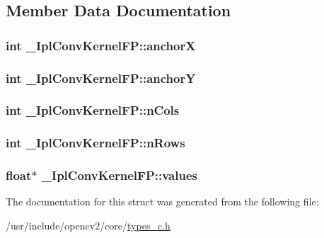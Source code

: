 \subsection{Member Data Documentation}
\hypertarget{struct__IplConvKernelFP_a26d834467c3155173b4fd458bd57d407}{
\subsubsection[{anchor\-X}]{\setlength{\rightskip}{0pt plus 5cm}int \-\_\-\-Ipl\-Conv\-Kernel\-F\-P\-::anchor\-X}}\label{struct__IplConvKernelFP_a26d834467c3155173b4fd458bd57d407}
\hypertarget{struct__IplConvKernelFP_a81e8df32bddad0435612ce88c8b1b2a7}{
\subsubsection[{anchor\-Y}]{\setlength{\rightskip}{0pt plus 5cm}int \-\_\-\-Ipl\-Conv\-Kernel\-F\-P\-::anchor\-Y}}\label{struct__IplConvKernelFP_a81e8df32bddad0435612ce88c8b1b2a7}
\hypertarget{struct__IplConvKernelFP_a61869edd3ab2cc2f59c3c6cc809bf05d}{
\subsubsection[{n\-Cols}]{\setlength{\rightskip}{0pt plus 5cm}int \-\_\-\-Ipl\-Conv\-Kernel\-F\-P\-::n\-Cols}}\label{struct__IplConvKernelFP_a61869edd3ab2cc2f59c3c6cc809bf05d}
\hypertarget{struct__IplConvKernelFP_a1875e5b13135e849ac8f701b328e2dee}{
\subsubsection[{n\-Rows}]{\setlength{\rightskip}{0pt plus 5cm}int \-\_\-\-Ipl\-Conv\-Kernel\-F\-P\-::n\-Rows}}\label{struct__IplConvKernelFP_a1875e5b13135e849ac8f701b328e2dee}
\hypertarget{struct__IplConvKernelFP_a754f41d0794aad5f4d2d067dd034c664}{
\subsubsection[{values}]{\setlength{\rightskip}{0pt plus 5cm}float$\ast$ \-\_\-\-Ipl\-Conv\-Kernel\-F\-P\-::values}}\label{struct__IplConvKernelFP_a754f41d0794aad5f4d2d067dd034c664}


The documentation for this struct was generated from the following file\-:\begin{DoxyCompactItemize}
\item 
/usr/include/opencv2/core/\hyperlink{core_2types__c_8h}{types\-\_\-c.\-h}\end{DoxyCompactItemize}
